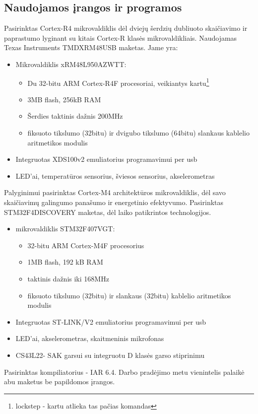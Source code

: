 \documentclass[a4paper, 12pt]{article} %
\begin{document}
\begin{onehalfspacing}
\section{Naudojamos \k{i}rangos ir programos}
Pasirinktas Cortex-R4 mikrovaldiklis d\.{e}l dviej\k{u} \v{s}erdzi\k{u} dubliuoto skai\v{c}iavimo ir paprastumo lyginant su kitais Cortex-R klas\.{e}s mikrovaldikliais. Naudojamas Texas Instruments TMDXRM48USB maketas. Jame yra:
\begin{itemize}
\item Mikrovaldiklis xRM48L950AZWTT:
\begin{itemize}
\item Du 32-bitu ARM Cortex-R4F procesoriai, veikiantys kartu\footnote{lockstep - kartu atlieka tas pa\v{c}ias komandas}
\item 3MB flash, 256kB RAM
\item \v{S}erdies taktinis da\v{z}nis 200MHz
\item fiksuoto tikslumo (32bitu) ir dvigubo tikslumo (64bitu) slankaus kablelio aritmetikos modulis
\end{itemize} 
\item Integruotas XDS100v2 emuliatorius programavimui per usb
\item LED'ai, temperat\=uros sensorius, \v{s}viesos sensorius, akselerometras
\end{itemize}
Palyginimui pasirinktas Cortex-M4 architekt\={u}ros mikrovaldiklis, d\.{e}l savo skai\v{c}iavim\k{u} galingumo pana\v{s}umo ir energetinio efektyvumo. Pasirinktas STM32F4DISCOVERY maketas, d\.{e}l laiko patikrintos technologijos.  
\begin{itemize}
\item mikrovaldiklis STM32F407VGT:
\begin{itemize}
\item 32-bitu ARM Cortex-M4F procesorius
\item 1MB flash, 192 kB RAM 
\item taktinis da\v{z}nis iki 168MHz 
\item fiksuoto tikslumo (32bitu) ir slankaus (32bitu) kablelio aritmetikos modulis
\end{itemize}
\item Integruotas ST-LINK/V2 emuliatorius programavimui per usb
\item LED'ai, akselerometras, skaitmeninis mikrofonas
\item CS43L22- SAK garsui su integruotu D klas\.es garso stiprinimu
\end{itemize}
Pasirinktas kompiliatorius - IAR 6.4. Darbo prad\.ejimo metu vienintelis palaik\.e abu maketus be papildomos \k{i}rangos. 

\end{onehalfspacing}
\end{document}
